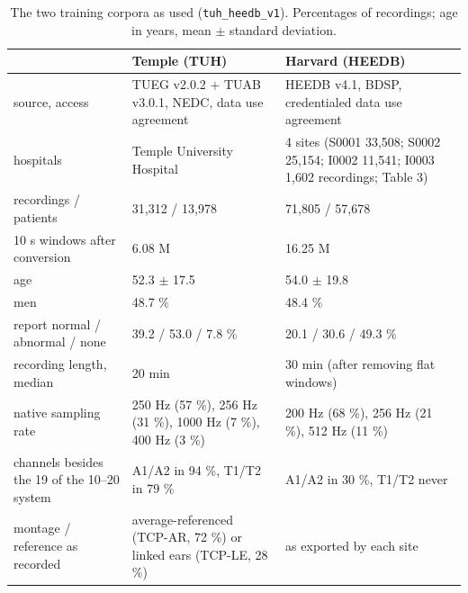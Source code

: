 \documentclass[11pt,a4paper]{article}
\begin{document}
\begin{table}[t]
\centering
\small
\caption{The two training corpora as used (\texttt{tuh\_heedb\_v1}). Percentages of recordings; age in years, mean $\pm$ standard deviation.}
\begin{tabular}{lll}
\toprule
\textbf{} & \textbf{Temple (TUH)} & \textbf{Harvard (HEEDB)} \\
\midrule
source, access & TUEG v2.0.2 + TUAB v3.0.1, NEDC, data use agreement & HEEDB v4.1, BDSP, credentialed data use agreement \\
hospitals & Temple University Hospital & 4 sites (S0001 33,508; S0002 25,154; I0002 11,541; I0003 1,602 recordings; Table 3) \\
recordings / patients & 31,312 / 13,978 & 71,805 / 57,678 \\
10 s windows after conversion & 6.08 M & 16.25 M \\
age & 52.3 $\pm$ 17.5 & 54.0 $\pm$ 19.8 \\
men & 48.7 \% & 48.4 \% \\
report normal / abnormal / none & 39.2 / 53.0 / 7.8 \% & 20.1 / 30.6 / 49.3 \% \\
recording length, median & 20 min & 30 min (after removing flat windows) \\
native sampling rate & 250 Hz (57 \%), 256 Hz (31 \%), 1000 Hz (7 \%), 400 Hz (3 \%) & 200 Hz (68 \%), 256 Hz (21 \%), 512 Hz (11 \%) \\
channels besides the 19 of the 10--20 system & A1/A2 in 94 \%, T1/T2 in 79 \% & A1/A2 in 30 \%, T1/T2 never \\
montage / reference as recorded & average-referenced (TCP-AR, 72 \%) or linked ears (TCP-LE, 28 \%) & as exported by each site \\
\bottomrule
\end{tabular}
\end{table}
\end{document}
